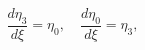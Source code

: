 \begin{equation}\label{30}
 \frac{d\eta_3}{d\xi} = \eta_0, \quad \frac{d\eta_0}{d\xi} = \eta_3,
\end{equation}

